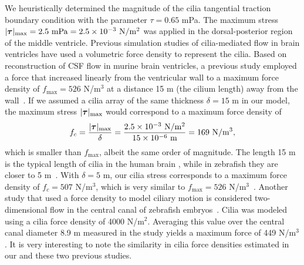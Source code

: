 \documentclass{WileyMSP-template}
\begin{document}
We heuristically determined the magnitude of the cilia tangential traction boundary condition
with the parameter $\tau = 0.65$ mPa. The maximum stress
$\vert\bm{\tau}\vert_{\mathrm{max}} = 2.5 \ \mathrm{mPa} = \num{2.5e-3} \ \mathrm{N/m^2}$
was applied in the dorsal-posterior region of the middle ventricle.
Previous simulation studies of cilia-mediated flow in brain ventricles have
used a volumetric force density to represent the cilia.
Based on reconstruction of CSF flow in murine brain ventricles,
a previous study employed a force that increased linearly from
the ventricular wall to a maximum force density of
$f_{\mathrm{max}} = 526$ N/$\mathrm{m^3}$ at a distance 15 \textmu m (the cilium length)
away from the wall~\cite{Siyahhan2014FlowVentricles}.
If we assumed a cilia array of the same thickness
$\delta = 15$ \textmu m in our model, the maximum stress $\vert\bm{\tau}\vert_{\mathrm{max}}$
would correspond to a maximum force density of 
\begin{equation*}
    f_c = \frac{\vert\bm{\tau}\vert_{\mathrm{max}}}{\delta}
        = \frac{\num{2.5e-3} \ \mathrm{N/m^2}}{\num{15e-6} \ \mathrm{m}}
        = 169 \ \mathrm{N/m^3},
\end{equation*}
which is smaller than $f_{\mathrm{max}}$, albeit the same order of magnitude.
The length 15 \textmu m is the typical length of cilia in the human brain
\cite{Afzelius2004CiliaRelatedDiseases, Siyahhan2014FlowVentricles},
while in zebrafish they are closer to 5 \textmu m~\cite{Olstad2019CiliaryDevelopment,
Salman2022ComputationalEmbryo, Ringers2023NovelEpithelia}.
With $\delta=5$ \textmu m, our cilia stress corresponds to a maximum force density of
$f_c=507$ N/$\mathrm{m^3}$, which is very similar to
$f_{\mathrm{max}} = 526$ N/$\mathrm{m^3}$~\cite{Siyahhan2014FlowVentricles}.
Another study that used a force density to model ciliary motion is
considered two-dimensional flow in the central canal of zebrafish
embryos~\cite{Thouvenin2020OriginCanal}.
Cilia was modeled using a cilia force density of
4000 N/$\mathrm{m^2}$. Averaging this value over the central canal diameter 8.9 \textmu m
measured in the study yields a maximum force of 449 N/$\mathrm{m^3}$.
It is very interesting to note the similarity 
in cilia force densities estimated in our and these two previous studies.
\end{document}
